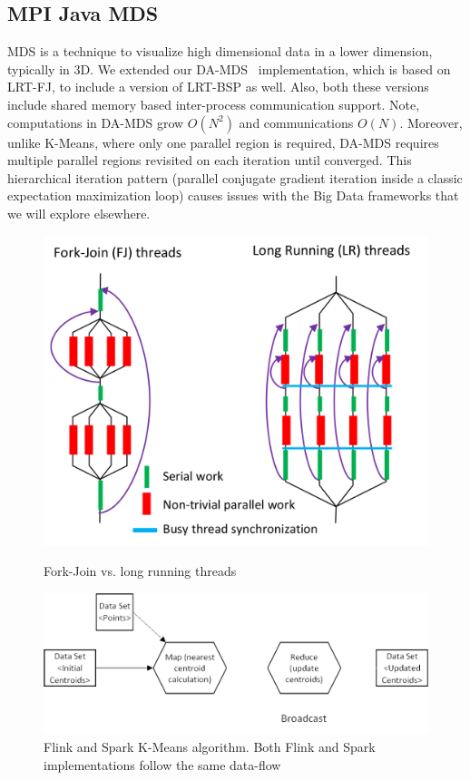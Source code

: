 \documentclass[10pt, conference, compsocconf]{IEEEtran}
\begin{document}
\subsection{MPI Java \ac{MDS}}
\ac{MDS} is a technique to visualize high dimensional data in a lower dimension, typically in 3D. We extended our \ac{DA-MDS}~\cite{hpc2016:spidaljava} implementation, which is based on \ac{LRT-FJ}, to include a version of \ac{LRT-BSP} as well. Also, both these versions include shared memory based inter-process communication support. Note, computations in \ac{DA-MDS} grow $O(N^2)$ and communications $O(N)$. Moreover, unlike K-Means, where only one parallel region is required, \ac{DA-MDS} requires multiple parallel regions revisited on each iteration until converged. This hierarchical iteration pattern (parallel conjugate gradient iteration inside a classic expectation maximization loop) causes issues with the Big Data frameworks that we will explore elsewhere.


\begin{figure}[!htb]
    \centering
    \begin{minipage}{.49\textwidth}
        \centering        
        \includegraphics[width=0.8\columnwidth]{images/fig_fj_vs_lrt}
        \caption{Fork-Join vs. long running threads}
        \label{fig:fig_fj_vs_lrt}
    \end{minipage}
    \hspace{1.4mm}
    \begin{minipage}{0.49\textwidth}
        \centering
        \includegraphics[width=1\columnwidth]{images/fig_kmeans_dataflow}
        \caption{Flink and Spark K-Means algorithm. Both Flink and Spark implementations follow the same data-flow}
        \label{fig:fig_flink_kmeans}
    \end{minipage}   
\end{figure}
\end{document}
